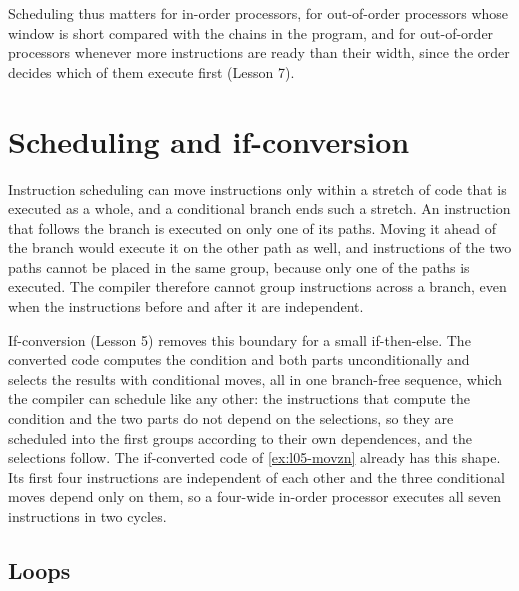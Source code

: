 \documentclass[../main.tex]{subfiles}
\begin{document}
Scheduling thus matters for in-order processors, for out-of-order processors
whose window is short compared with the chains in the program, and for
out-of-order processors whenever more instructions are ready than their width,
since the order decides which of them execute first (Lesson 7).

\section{Scheduling and if-conversion}
\label{sec:l10-if-conversion}

Instruction scheduling can move instructions only within a stretch of code
that is executed as a whole, and a conditional branch ends such a
stretch.  An instruction that
follows the branch is executed on only one of its paths.  Moving it ahead of
the branch would execute it on the other path as well, and instructions of the
two paths cannot be placed in the same group, because only one of the paths is
executed.  The compiler therefore cannot group instructions across a branch,
even when the instructions before and after it are independent.

If-conversion (Lesson 5) removes this boundary for a small
if-then-else.  The converted code computes the condition and both parts
unconditionally and selects the results with conditional moves, all in one
branch-free sequence, which the compiler can schedule like any other: the
instructions that compute the condition and the two parts do not depend on
the selections, so they are scheduled into the first groups according to
their own dependences, and the selections follow.  The if-converted code of \cref{ex:l05-movzn}
already has this shape.  Its first four instructions are independent of each
other and the three conditional moves depend only on them, so a four-wide
in-order processor executes all seven instructions in two cycles.

\subsection{Loops}
\end{document}
